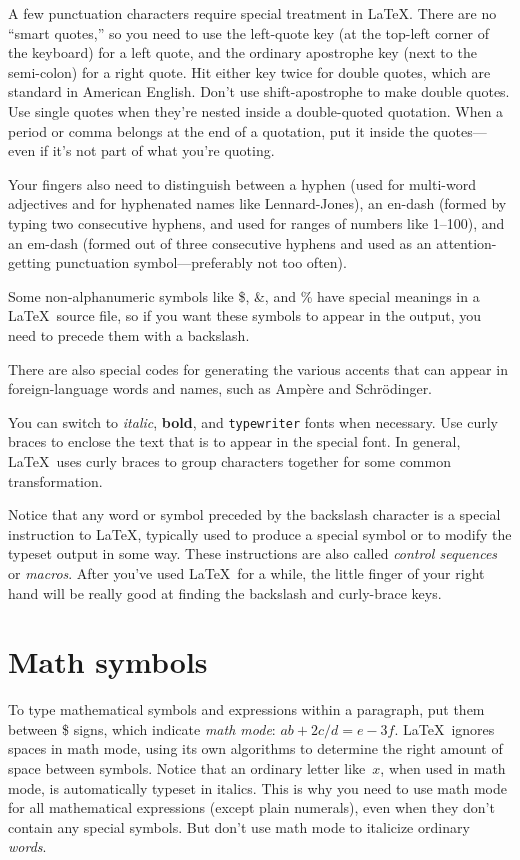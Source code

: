 \documentclass[prb,preprint]{revtex4-2}
\begin{document}
A few punctuation characters require special treatment in \LaTeX. There 
are no ``smart quotes,'' so you need to use the left-quote key (at the 
top-left corner of the keyboard) for a left quote, and the ordinary apostrophe
key (next to the semi-colon) for a right quote. Hit either key twice for double
quotes, which are standard in American English.  Don't use shift-apostrophe
to make double quotes.  Use single quotes when they're nested inside a 
double-quoted quotation.  When a period or comma belongs at the end of
a quotation, put it inside the quotes---even if it's not part of what you're
quoting.\cite{nevermindlogic}

Your fingers also need to distinguish between a hyphen (used for
multi-word adjectives and for hyphenated names like Lennard-Jones), an 
en-dash (formed by typing two consecutive hyphens, and used for ranges 
of numbers like 1--100), and an em-dash (formed out of three consecutive
hyphens and used as an attention-getting punctuation symbol---preferably 
not too often).

Some non-alphanumeric symbols like \$, \&, and \% have special meanings 
in a \LaTeX\ source file, so if you want these symbols to appear in the output, 
you need to precede them with a backslash.

There are also special codes for generating the various accents
that can appear in foreign-language words and names, such as Amp\`ere
and Schr\"odinger.\cite{FontEncodingComment}

You can switch to \textit{italic}, \textbf{bold}, and \texttt{typewriter} fonts
when necessary. Use curly braces to enclose the text that is to appear in 
the special font. In general, \LaTeX\ uses curly braces to group characters 
together for some common transformation.

Notice that any word or symbol preceded by the backslash character is
a special instruction to \LaTeX, typically used to produce a special 
symbol or to modify the typeset output in some way. These instructions 
are also called \textit{control sequences} or \textit{macros}.  
After you've used \LaTeX\ for a while, the little finger of your right 
hand will be really good at finding the backslash and curly-brace keys.


\section{Math symbols}

To type mathematical symbols and expressions within a paragraph, put
them between \$ signs, which indicate \textit{math mode}: $ab + 2c/d = e-3f$.
\LaTeX\ ignores spaces in math mode, using its own algorithms to determine
the right amount of space between symbols.  Notice that an ordinary letter 
like~$x$, when used in math mode, is automatically typeset in italics. 
This is why you need to use math mode for all mathematical
expressions (except plain numerals), even when they don't contain any 
special symbols.  But don't use math mode to italicize ordinary \textit{words}.
\end{document}
